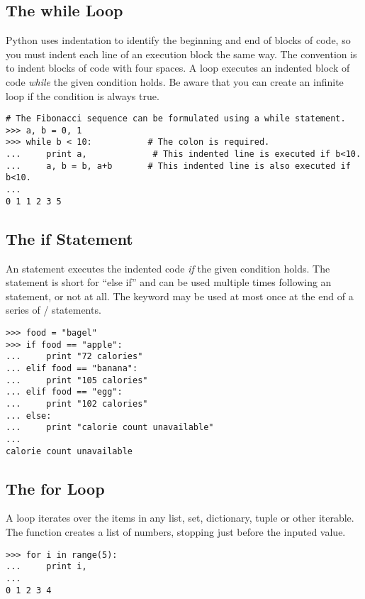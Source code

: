\subsection*{The while Loop}
\begin{example}
Python uses indentation to identify the beginning and end of blocks of code, so you must indent each line of an execution block the same way.
The convention is to indent blocks of code with four spaces. A  loop executes an indented block of code \emph{while} the given condition holds. 
Be aware that you can create an infinite loop if the condition is always true.

\begin{lstlisting}
# The Fibonacci sequence can be formulated using a while statement. 
>>> a, b = 0, 1
>>> while b < 10:           # The colon is required.
...     print a,             # This indented line is executed if b<10.
...     a, b = b, a+b       # This indented line is also executed if b<10.
...     
0 1 1 2 3 5
\end{lstlisting}
\end{example}

\subsection*{The if Statement}
\begin{example}
An  statement executes the 
indented code \emph{if} the given condition holds.
The  statement is short for ``else if'' and can be used multiple times following an  statement, or not at all. 
The  keyword may be used at most once at the end of a series of / statements.
\begin{lstlisting}
>>> food = "bagel"
>>> if food == "apple":
...     print "72 calories"
... elif food == "banana":
...     print "105 calories"
... elif food == "egg":
...     print "102 calories"
... else: 
...     print "calorie count unavailable"
...     
calorie count unavailable
\end{lstlisting}
\end{example}

\subsection*{The for Loop}
\begin{example}
A  loop iterates over the items in any list, set, dictionary, tuple or other iterable. 
The  function creates a list of numbers, stopping just before the inputed value. 

\begin{lstlisting}
>>> for i in range(5):
...     print i,
...     
0 1 2 3 4
\end{lstlisting}
\end{example}


